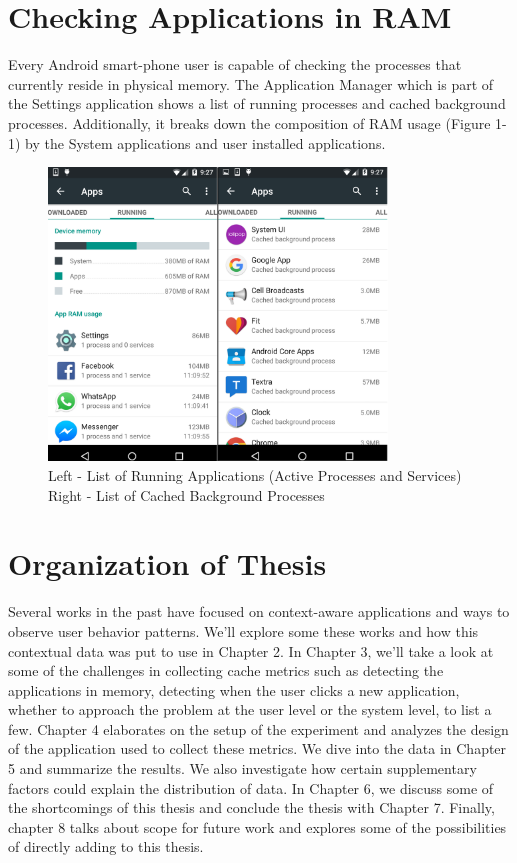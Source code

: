 \documentclass[12pt]{uthesis-v12}  %
\begin{document}
	\section{Checking Applications in RAM}
		Every Android smart-phone user is capable of checking the processes that currently reside in physical memory. The Application Manager which is part of the Settings application shows a list of running processes and cached background processes. Additionally, it breaks down the composition of RAM usage (Figure 1-1) by the System applications and user installed applications. 
		
		\begin{figure}[h]
			\centering
			\includegraphics[width = 90mm]{images/runningApps.png}
			\caption[Running Apps and Cached Background Processes]
			{Left - List of Running Applications (Active Processes and Services)\\
				Right - List of Cached Background Processes}
		\end{figure}	

	\section{Organization of Thesis}
		Several works in the past have focused on context-aware applications and ways to observe user behavior patterns. We'll explore some these works and how this contextual data was put to use in Chapter 2. In Chapter 3, we'll take a look at some of the challenges in collecting cache metrics such as detecting the applications in memory, detecting when the user clicks a new application, whether to approach the problem at the user level or the system level, to list a few. Chapter 4 elaborates on the setup of the experiment and analyzes the design of the application used to collect these metrics. We dive into the data in Chapter 5 and summarize the results. We also investigate how certain supplementary factors could explain the distribution of data. In Chapter 6, we discuss some of the shortcomings of this thesis and conclude the thesis with Chapter 7. Finally, chapter 8 talks about scope for future work and explores some of the possibilities of directly adding to this thesis.  
\end{document}
